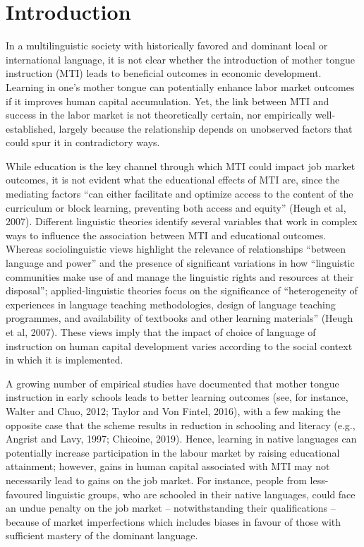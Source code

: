 \section{Introduction}

In a multilinguistic society with historically favored and dominant local or international language, it is not clear whether the introduction of mother tongue instruction (MTI) leads to beneficial outcomes in economic development.  Learning in one's mother tongue can potentially enhance labor market outcomes if it improves human capital accumulation. Yet, the link between MTI and success in the labor market is not theoretically certain, nor empirically well-established, largely because the relationship depends on unobserved factors that could spur it in contradictory ways.  

While education is the key channel through which MTI could impact job market outcomes, it is not evident what the educational effects of MTI are, since the mediating factors \enquote{can either facilitate and optimize access to the content of the curriculum or block learning, preventing both access and equity} (Heugh et al, 2007). Different linguistic theories identify several variables that work in complex ways to influence the association between MTI and educational outcomes. Whereas sociolinguistic views highlight the relevance of relationships \enquote{between language and power} and the presence of significant variations in how  \enquote{linguistic communities make use of and manage the linguistic rights and resources at their disposal}; applied-linguistic theories focus on the significance of \enquote{heterogeneity of experiences in language teaching methodologies, design of language teaching programmes, and availability of textbooks and other learning materials} (Heugh et al, 2007). These views imply that the impact of choice of language of instruction on human capital development varies according to the social context in which it is implemented. 

A growing number of empirical studies have documented that mother tongue instruction in early schools leads to better learning outcomes (see, for instance, Walter and Chuo, 2012; Taylor and Von Fintel, 2016), with a few making the opposite case that the scheme results in reduction in schooling and literacy (e.g., Angrist and Lavy, 1997; Chicoine, 2019). Hence, learning in native languages can potentially increase participation in the labour market by raising educational attainment; however, gains in human capital associated with MTI may not necessarily lead to gains on the job market. For instance, people from less-favoured linguistic groups, who are schooled in their native languages, could face an undue penalty on the job market – notwithstanding their qualifications – because of market imperfections  which includes biases in favour of those with sufficient mastery of the dominant language. 

